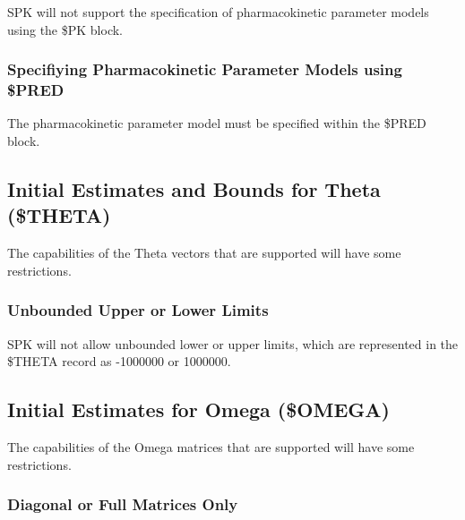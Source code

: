 \documentclass{article}
\begin{document}
SPK will not support the specification of pharmacokinetic parameter
models using the \$PK block.


\subsubsection{Specifiying Pharmacokinetic Parameter Models using \$PRED}

The pharmacokinetic parameter model must be specified within the
\$PRED block.


\subsection{Initial Estimates and Bounds for Theta (\$THETA)}

The capabilities of the Theta vectors that are supported will 
have some restrictions.


\subsubsection{Unbounded Upper or Lower Limits}

SPK will not allow unbounded lower or upper limits, which are
represented in the \$THETA record as -1000000 or 1000000.


\subsection{Initial Estimates for Omega (\$OMEGA)}

The capabilities of the Omega matrices that are supported will 
have some restrictions.


\subsubsection{Diagonal or Full Matrices Only}
\end{document}
